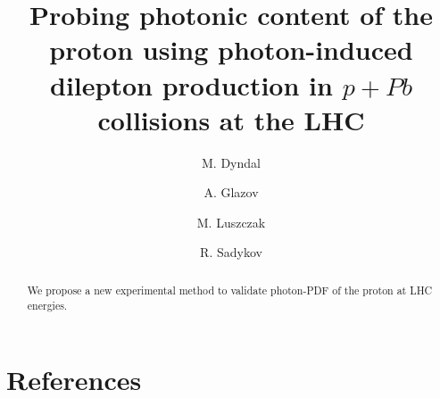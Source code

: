 \documentclass[preprint,10pt]{elsarticle}
\begin{document}
\begin{frontmatter}
\title{Probing photonic content of the proton using photon-induced dilepton production in $p+Pb$ collisions at the LHC}


\author{M. Dyndal}
\address{DESY}
\author{A. Glazov}
\address{DESY}
\author{M. Luszczak}
\address{...}
\author{R. Sadykov}
\address{...}



\begin{abstract}
We propose a new experimental method to validate photon-PDF of the proton at LHC energies.
\end{abstract}



\end{frontmatter}












\section*{References}


\end{document}
